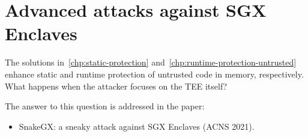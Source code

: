 \chapter{Advanced attacks against SGX Enclaves}
\label{chp:advanced-threats} 

The solutions in~\ref{chp:static-protection} 
and~\ref{chp:runtime-protection-untrusted} enhance static and runtime 
protection of untrusted code in memory, respectively.
What happens when the attacker focuses on the TEE itself?

The answer to this question is addressed in the paper:
\begin{itemize}
	\item SnakeGX: a sneaky attack against SGX Enclaves (ACNS 2021).
\end{itemize}